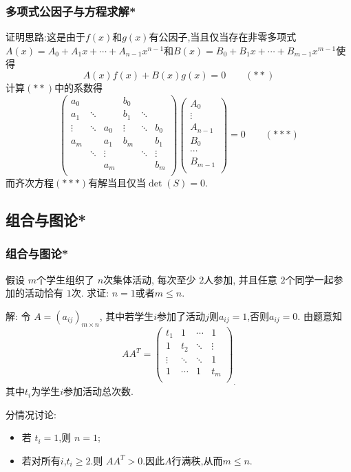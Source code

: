 \begin{frame}\frametitle{多项式公因子与方程求解*}
    证明思路:这是由于$f(x)$和$g(x)$有公因子,当且仅当存在非零多项式$A(x)=A_0+A_1x+\cdots+A_{n-1}x^{n-1}$和$B(x)=B_0+B_1x+\cdots+B_{m-1}x^{m-1}$使得
    \[A(x)f(x)+B(x)g(x)=0\qquad(**)\]
    计算$(**)$中的系数得
    \[\begin{pmatrix}
    a_0 &&& b_0&&\\
    a_1 &\ddots&& b_1&\ddots&\\
    \vdots &\ddots&a_0& \vdots&\ddots&b_0\\
    a_m &&a_1& b_m&&b_1\\
     &\ddots&\vdots&&\ddots& \vdots\\
    &&a_m&&&b_m\\
    \end{pmatrix}
    \begin{pmatrix}A_0\\\vdots\\A_{n-1}\\B_0\\\cdots\\B_{m-1}\\\end{pmatrix}=0\qquad(***)\]
    而齐次方程$(***)$有解当且仅当$\det(S)=0$.
    \end{frame}





    \subsection{组合与图论*}
\begin{frame}\frametitle{组合与图论*}
    \begin{question}
    假设 $m$个学生组织了 $n$次集体活动, 每次至少 $2$人参加, 并且任意 $2$个同学一起参加的活动恰有 $1$次. 求证: $n=1$或者$m\leq n$.
    \end{question}
    解: 令 $A=(a_{ij})_{m\times n}$, 其中若学生$i$参加了活动$j$则$a_{ij}=1$,否则$a_{ij}=0$. 由题意知
    \[AA^T = \begin{pmatrix} t_1 & 1&\cdots&1\\1&t_2&\ddots&\vdots\\\vdots&\ddots&\ddots&1\\1&\cdots&1&t_m\\\end{pmatrix}_.\]
    其中$t_i$为学生$i$参加活动总次数.

    分情况讨论:
    \begin{itemize}
    \item 若 $t_i=1$,则 $n=1$;
    \item 若对所有$i$,$t_i\geq2$.则 $AA^T>0$.因此$A$行满秩,从而$m\leq n$.
    \end{itemize}
    \end{frame}






